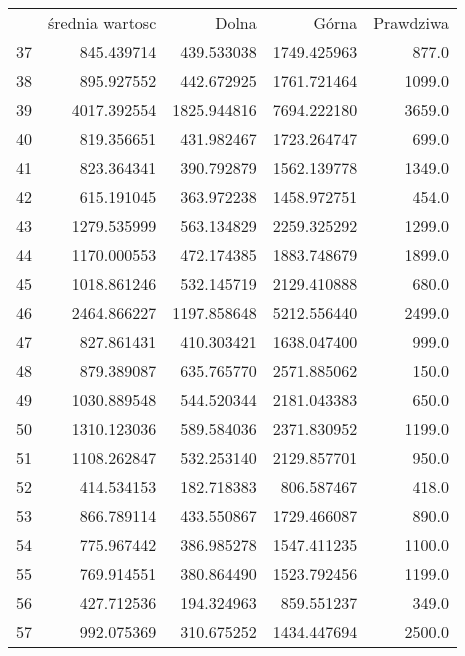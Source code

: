 \documentclass[11pt,a4paper]{article}
\begin{document}
	
		\begin{tabular}{lrrrr}
			 
			{} &  średnia wartosc &        Dolna &         Górna &  Prawdziwa \\
		
		
		37 &       845.439714 &   439.533038 &   1749.425963 &      877.0 \\
		38 &       895.927552 &   442.672925 &   1761.721464 &     1099.0 \\
		39 &      4017.392554 &  1825.944816 &   7694.222180 &     3659.0 \\
		40 &       819.356651 &   431.982467 &   1723.264747 &      699.0 \\
		41 &       823.364341 &   390.792879 &   1562.139778 &     1349.0 \\
		42 &       615.191045 &   363.972238 &   1458.972751 &      454.0 \\
		43 &      1279.535999 &   563.134829 &   2259.325292 &     1299.0 \\
		44 &      1170.000553 &   472.174385 &   1883.748679 &     1899.0 \\
		45 &      1018.861246 &   532.145719 &   2129.410888 &      680.0 \\
		46 &      2464.866227 &  1197.858648 &   5212.556440 &     2499.0 \\
		47 &       827.861431 &   410.303421 &   1638.047400 &      999.0 \\
		48 &       879.389087 &   635.765770 &   2571.885062 &      150.0 \\
		49 &      1030.889548 &   544.520344 &   2181.043383 &      650.0 \\
		50 &      1310.123036 &   589.584036 &   2371.830952 &     1199.0 \\
		51 &      1108.262847 &   532.253140 &   2129.857701 &      950.0 \\
		52 &       414.534153 &   182.718383 &    806.587467 &      418.0 \\
		53 &       866.789114 &   433.550867 &   1729.466087 &      890.0 \\
		54 &       775.967442 &   386.985278 &   1547.411235 &     1100.0 \\
		55 &       769.914551 &   380.864490 &   1523.792456 &     1199.0 \\
		56 &       427.712536 &   194.324963 &    859.551237 &      349.0 \\
		57 &       992.075369 &   310.675252 &   1434.447694 &     2500.0 \\

\end{tabular}
\end{document}
